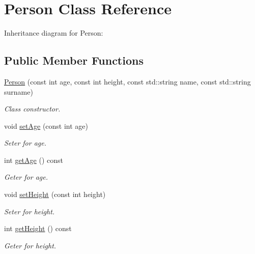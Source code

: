 \hypertarget{classPerson}{}\section{Person Class Reference}
\label{classPerson}


Inheritance diagram for Person\+:
\subsection*{Public Member Functions}
\begin{DoxyCompactItemize}
\item 
\hyperlink{classPerson_a95e510cfe66c3db653f18535ac5a507c}{Person} (const int age, const int height, const std\+::string name, const std\+::string surname)
\begin{DoxyCompactList}\small\item\em Class constructor. \end{DoxyCompactList}\item 
void \hyperlink{classPerson_a82373821fca84791619839131cfd2706}{set\+Age} (const int age)
\begin{DoxyCompactList}\small\item\em Seter for age. \end{DoxyCompactList}\item 
\mbox{\label{classPerson_a4b66dbee570398920b8fb6aacddd2559}} 
int \hyperlink{classPerson_a4b66dbee570398920b8fb6aacddd2559}{get\+Age} () const
\begin{DoxyCompactList}\small\item\em Geter for age. \end{DoxyCompactList}\item 
void \hyperlink{classPerson_ad01c1735b506b0690f1d179d548b5fab}{set\+Height} (const int height)
\begin{DoxyCompactList}\small\item\em Seter for height. \end{DoxyCompactList}\item 
\mbox{\label{classPerson_a9ecf449a118985ac470b554f7131b408}} 
int \hyperlink{classPerson_a9ecf449a118985ac470b554f7131b408}{get\+Height} () const
\begin{DoxyCompactList}\small\item\em Geter for height. \end{DoxyCompactList}\item 

\end{DoxyCompactItemize}
